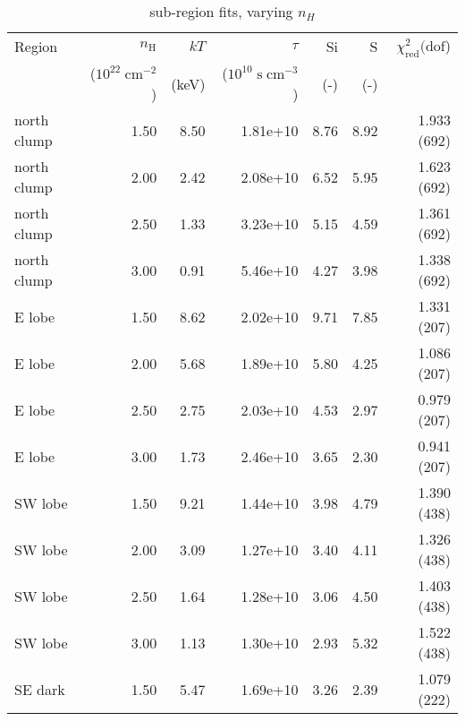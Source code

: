 \documentclass[preprint2,tighten,trackchanges]{aastex6}
\newcommand*{\mt}{\mathrm}
\newcommand*{\unit}[1]{\;\mt{#1}}  %
\begin{document}
\begin{table*}
    \centering
    \caption{sub-region fits, varying $n_H$}
    \begin{tabular}{@{}lrrrrrr@{}}
        \toprule
        Region & $n_\mathrm{H}$             & $kT$  & $\tau$                        & Si  & S   & $\chi^2_{\mathrm{red}} (\mathrm{dof}$) \\
               & ($10^{22} \unit{cm^{-2}}$) & (keV) & ($10^{10} \unit{s\;cm^{-3}}$) & (-) & (-) &  \\
        \midrule
        north clump & 1.50 & 8.50 & 1.81e+10 & 8.76 & 8.92 & 1.933 (692) \\  %
        north clump & 2.00 & 2.42 & 2.08e+10 & 6.52 & 5.95 & 1.623 (692) \\  %
        north clump & 2.50 & 1.33 & 3.23e+10 & 5.15 & 4.59 & 1.361 (692) \\  %
        north clump & 3.00 & 0.91 & 5.46e+10 & 4.27 & 3.98 & 1.338 (692) \\  %
        \midrule
        E lobe & 1.50 & 8.62 & 2.02e+10 & 9.71 & 7.85 & 1.331 (207) \\  %
        E lobe & 2.00 & 5.68 & 1.89e+10 & 5.80 & 4.25 & 1.086 (207) \\  %
        E lobe & 2.50 & 2.75 & 2.03e+10 & 4.53 & 2.97 & 0.979 (207) \\  %
        E lobe & 3.00 & 1.73 & 2.46e+10 & 3.65 & 2.30 & 0.941 (207) \\  %
        \midrule
        SW lobe & 1.50 & 9.21 & 1.44e+10 & 3.98 & 4.79 & 1.390 (438) \\  %
        SW lobe & 2.00 & 3.09 & 1.27e+10 & 3.40 & 4.11 & 1.326 (438) \\  %
        SW lobe & 2.50 & 1.64 & 1.28e+10 & 3.06 & 4.50 & 1.403 (438) \\  %
        SW lobe & 3.00 & 1.13 & 1.30e+10 & 2.93 & 5.32 & 1.522 (438) \\  %
        \midrule
        SE dark & 1.50 & 5.47 & 1.69e+10 & 3.26 & 2.39 & 1.079 (222) \\  %

\end{tabular}
\end{table*}
\end{document}
